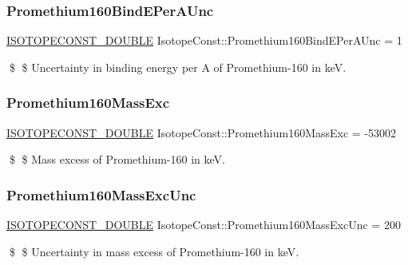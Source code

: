 \subsubsection{\texorpdfstring{Promethium160\+Bind\+E\+Per\+A\+Unc}{Promethium160BindEPerAUnc}}
{\footnotesize\ttfamily \mbox{\hyperlink{group___isotope_const-_macros_ga8f45a7272ce02c0b4c65c44636ed719a}{I\+S\+O\+T\+O\+P\+E\+C\+O\+N\+S\+T\+\_\+\+D\+O\+U\+B\+LE}} Isotope\+Const\+::\+Promethium160\+Bind\+E\+Per\+A\+Unc = 1}

\$ \$ Uncertainty in binding energy per A of Promethium-\/160 in keV. \mbox{\label{group___isotope_const-_promethium-_pm160_ga92a205bf7d2b52947ed3cfc4440dbb86}} 
\subsubsection{\texorpdfstring{Promethium160\+Mass\+Exc}{Promethium160MassExc}}
{\footnotesize\ttfamily \mbox{\hyperlink{group___isotope_const-_macros_ga8f45a7272ce02c0b4c65c44636ed719a}{I\+S\+O\+T\+O\+P\+E\+C\+O\+N\+S\+T\+\_\+\+D\+O\+U\+B\+LE}} Isotope\+Const\+::\+Promethium160\+Mass\+Exc = -\/53002}

\$ \$ Mass excess of Promethium-\/160 in keV. \mbox{\label{group___isotope_const-_promethium-_pm160_gacf1e4e32385a68de7ab2d12b0232c3b8}} 
\subsubsection{\texorpdfstring{Promethium160\+Mass\+Exc\+Unc}{Promethium160MassExcUnc}}
{\footnotesize\ttfamily \mbox{\hyperlink{group___isotope_const-_macros_ga8f45a7272ce02c0b4c65c44636ed719a}{I\+S\+O\+T\+O\+P\+E\+C\+O\+N\+S\+T\+\_\+\+D\+O\+U\+B\+LE}} Isotope\+Const\+::\+Promethium160\+Mass\+Exc\+Unc = 200}

\$ \$ Uncertainty in mass excess of Promethium-\/160 in keV. \mbox{\label{group___isotope_const-_promethium-_pm160_ga1abfa58d0ffaa00226fa84725a278a0b}} 
